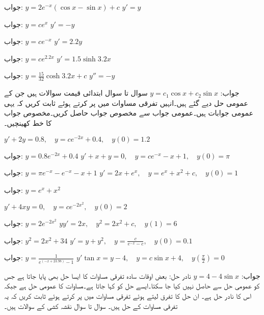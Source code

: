 جواب:\quad
 $y=2e^{-x}(\cos x-\sin x)+c$
\quad
$y'=y$

جواب:\quad
$y=ce^{x}$
\quad
$y'=-y$

جواب:\quad
$y=ce^{-x}$
\quad
$y'=2.2y$

جواب:\quad
$y=ce^{2.2x}$
\quad
$y'=1.5\sinh 3.2x$

جواب:\quad
$y=\tfrac{15}{32}\cosh 3.2x+c$
\quad
$y''=-y$

جواب:\quad
$y=c_1\cos x+c_2\sin x$
سوال  تا سوال  ابتدائی قیمت سوالات ہیں جن کے عمومی حل دیے گئے ہیں۔انہیں تفرقی مساوات میں پر کرتے ہوئے ثابت کریں کہ یہی عمومی جوابات ہیں۔عمومی جواب سے مخصوص جواب حاصل کریں۔مخصوص جواب کا خط کھینچیں۔

\quad
$y'+2y=0.8,\quad y=ce^{-2x}+0.4,\quad y(0)=1.2$

جواب:\quad
$y=0.8e^{-2x}+0.4$
\quad
$y'+x+y=0,\quad y=ce^{-x}-x+1,\quad y(0)=\pi$

جواب:\quad
$y=\pi e^{-x}-e^{-x}-x+1$
\quad
$y'=2x+e^{x},\quad y=e^{x}+x^2+c,\quad y(0)=1$

جواب:\quad
$y=e^{x}+x^2$


\quad
$y'+4xy=0,\quad y=ce^{-2x^2},\quad y(0)=2$

جواب:\quad
$y=2e^{-2x^2}$
\quad
$yy'=2x,\quad y^2=2x^2+c,\quad y(1)=6$

جواب:\quad
$y^2=2x^2+34$
\quad
$y'=y+y^2,\quad y=\tfrac{c}{e^{-x}-c},\quad y(0)=0.1$

جواب:\quad
$y=\tfrac{1}{e^{(-x+23.98)}-1}$
\quad
$y'\tan x=y-4,\quad y=c\sin x+4,\quad y(\tfrac{\pi}{2})=0$

جواب:\quad
$y=4-4\sin x$
نادر حل: بعض اوقات سادہ تفرقی مساوات کا ایسا حل بھی پایا جاتا ہے جس کو عمومی حل سے حاصل نہیں کیا جا سکتا۔ایسے حل کو  کہا جاتا ہے۔مساوات  کا عمومی حل  ہے جبکہ اس کا  نادر حل  ہے۔ ان حل کا تفرق لیتے ہوئے تفرقی مساوات میں پر کرتے ہوئے ثابت کریں کہ یہ تفرقی مساوات کے حل ہیں۔
سوال  تا سوال  نقشہ کشی کے سوالات ہیں۔

